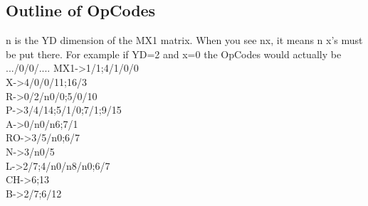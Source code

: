 \documentclass[12pt,a4paper]{article}
\begin{document}
\subsection{Outline of OpCodes}
n is the YD dimension of the MX1 matrix. When you see nx, it means n x's must be put there. For example if YD=2 and x=0 the OpCodes would actually be .../0/0/....
MX1->1/1;4/1/0/0\\
X->4/0/0/11;16/3\\
R->0/2/n0/0;5/0/10\\
P->3/4/14;5/1/0;7/1;9/15\\
A->0/n0/n6;7/1\\
RO->3/5/n0;6/7\\
N->3/n0/5\\
L->2/7;4/n0/n8/n0;6/7\\
CH->6;13\\
B->2/7;6/12\\
\end{document}
